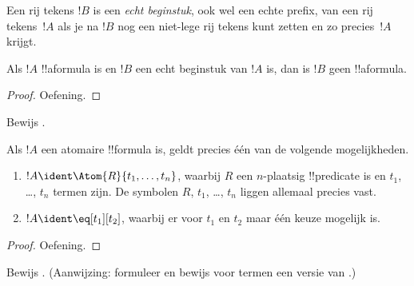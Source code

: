 \documentclass[openany]{memoir}
\begin{document}
\begin{defn}
Een rij tekens $!B$ is een \emph{echt beginstuk}, ook wel een echte
prefix, van een rij tekens~$!A$ als je na $!B$ nog een niet-lege rij
tekens kunt zetten en zo precies~$!A$ krijgt.
\end{defn}

\begin{lem}
Als $!A$ !!a{formula} is en $!B$ een echt beginstuk van $!A$ is, dan
is $!B$ geen !!a{formula}.
\end{lem}

\begin{proof}
Oefening.
\end{proof}

\begin{prob}
Bewijs .
\end{prob}

\begin{prop}
Als $!A$ een atomaire !!{formula} is, geldt precies één van de volgende
mogelijkheden.
\begin{enumerate}
\item $!A \ident \Atom{R}{t_1,\dots,t_n}$, waarbij $R$ een $n$-plaatsig
  !!{predicate} is en $t_1$, \dots, $t_n$ termen zijn. De symbolen $R$,
  $t_1$, \dots, $t_n$ liggen allemaal precies vast.
\item $!A \ident \eq[t_1][t_2]$, waarbij er voor $t_1$ en $t_2$ maar
  één keuze mogelijk is.
\end{enumerate}
\end{prop}

\begin{proof}
Oefening.
\end{proof}

\begin{prob}
Bewijs . (Aanwijzing: formuleer
en bewijs voor termen een versie van .)
\end{prob}
\end{document}
